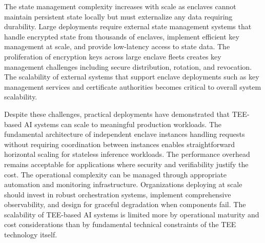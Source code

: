The state management complexity increases with scale as enclaves cannot maintain persistent state locally but must externalize any data requiring durability. Large deployments require external state management systems that handle encrypted state from thousands of enclaves, implement efficient key management at scale, and provide low-latency access to state data. The proliferation of encryption keys across large enclave fleets creates key management challenges including secure distribution, rotation, and revocation. The scalability of external systems that support enclave deployments such as key management services and certificate authorities becomes critical to overall system scalability.

Despite these challenges, practical deployments have demonstrated that TEE-based AI systems can scale to meaningful production workloads. The fundamental architecture of independent enclave instances handling requests without requiring coordination between instances enables straightforward horizontal scaling for stateless inference workloads. The performance overhead remains acceptable for applications where security and verifiability justify the cost. The operational complexity can be managed through appropriate automation and monitoring infrastructure. Organizations deploying at scale should invest in robust orchestration systems, implement comprehensive observability, and design for graceful degradation when components fail. The scalability of TEE-based AI systems is limited more by operational maturity and cost considerations than by fundamental technical constraints of the TEE technology itself.